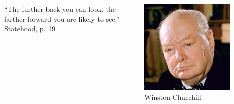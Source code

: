 \begin{frame}
    \begin{columns}[onlytextwidth]
            ``The further back you can look, the farther forward you are likely to see.'' \\
            \vspace{20pt} Statehood, p. 19

            \centering
            \includegraphics[width=0.75\textwidth]{img/winston-churchill.png} \\
            Winston Churchill \\
    \end{columns}
\end{frame}

